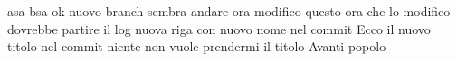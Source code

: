 \documentclass{article}
\begin{document}
asa
bsa
ok nuovo branch
sembra andare
ora modifico questo
ora che lo modifico dovrebbe partire il log
nuova riga con nuovo nome nel commit
Ecco il nuovo titolo nel commit
niente non vuole prendermi il titolo
Avanti popolo
\end{document}
